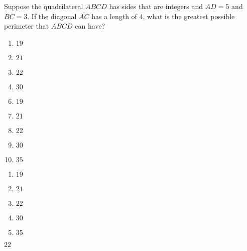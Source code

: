 

 Suppose the quadrilateral $ABCD$ has sides that are integers and $AD=5$ and $BC=3$.  If the diagonal $\overline{AC}$ has a length of 4, what is the greatest possible perimeter that $ABCD$ can have?



\ifsat
	\begin{enumerate}[label=\Alph*)]
		\item   $19$
		\item  $21$
		\item  $22$ %
		\item  $30$ 
	\end{enumerate}
\else
\fi

\ifacteven
	\begin{enumerate}[label=\textbf{\Alph*.},itemsep=\fill,align=left]
		\setcounter{enumii}{5}
		\item   $19$
		\item  $21$
		\item  $22$ %
		\addtocounter{enumii}{1}
		\item  $30$ 
		\item  $35$ 
	\end{enumerate}
\else
\fi

\ifactodd
	\begin{enumerate}[label=\textbf{\Alph*.},itemsep=\fill,align=left]
		\item   $19$
		\item  $21$
		\item  $22$ %
		\item  $30$ 
		\item  $35$ 
	\end{enumerate}
\else
\fi

\ifgridin
  $22$ %
		
\else
\fi

